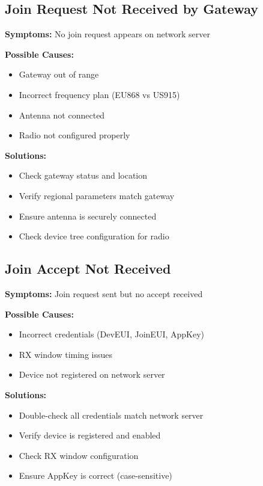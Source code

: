 \documentclass[11pt,a4paper]{article}
\begin{document}
\subsection{Join Request Not Received by Gateway}

\begin{warningbox}
\textbf{Symptoms:} No join request appears on network server

\textbf{Possible Causes:}
\begin{itemize}
    \item Gateway out of range
    \item Incorrect frequency plan (EU868 vs US915)
    \item Antenna not connected
    \item Radio not configured properly
\end{itemize}

\textbf{Solutions:}
\begin{itemize}
    \item Check gateway status and location
    \item Verify regional parameters match gateway
    \item Ensure antenna is securely connected
    \item Check device tree configuration for radio
\end{itemize}
\end{warningbox}

\subsection{Join Accept Not Received}

\begin{warningbox}
\textbf{Symptoms:} Join request sent but no accept received

\textbf{Possible Causes:}
\begin{itemize}
    \item Incorrect credentials (DevEUI, JoinEUI, AppKey)
    \item RX window timing issues
    \item Device not registered on network server
\end{itemize}

\textbf{Solutions:}
\begin{itemize}
    \item Double-check all credentials match network server
    \item Verify device is registered and enabled
    \item Check RX window configuration
    \item Ensure AppKey is correct (case-sensitive)
\end{itemize}
\end{warningbox}
\end{document}
